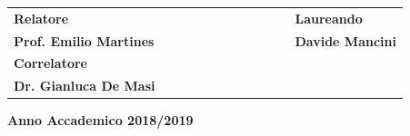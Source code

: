 \documentclass[twoside,openright,titlepage,headings,footinclude=true,cleardoublepage=empty,BCOR=5mm,11pt,a4paper,english]{book}
\begin{document}
\begin{titlepage}
\vspace{20mm}
\begin{spacing}{2}
\begin{tabular}{ l  c  c c c  cc c c c c  l }
{\Large{\bf Relatore}} &&&&&&&&&&& {\Large{\bf Laureando}}\\
{\Large{\bf Prof. Emilio Martines}} &&&&&&&&&&& {\Large{\bf Davide Mancini}}\\
{\Large{\bf Correlatore}}\\
{\Large{\bf Dr. Gianluca De Masi}}\\
\end{tabular}
\end{spacing}
\vspace{15 mm}

\begin{center}
{\Large{\bf Anno Accademico 2018/2019}}
\end{center}
\end{titlepage}
\clearpage{\pagestyle{empty}\cleardoublepage}


\tableofcontents

\pagestyle{headings}



\clearpage

\clearpage

\clearpage

\clearpage

\clearpage

\clearpage

\printbibliography
\end{document}
